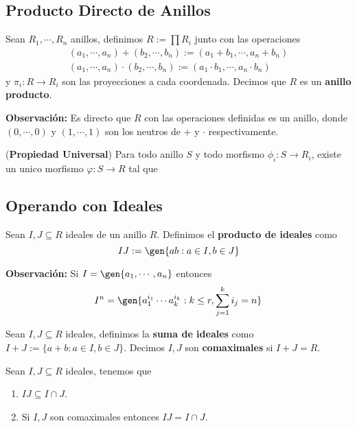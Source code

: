 \documentclass{article}
\begin{document}
\subsection{Producto Directo de Anillos}
\begin{dfn}
    Sean $R_{1},\cdots,R_{n}$ anillos, definimos $R:=\prod R_{i}$ junto con las operaciones
    \begin{align*}
        (a_{1},\cdots,a_{n})+(b_{2},\cdots,b_{n}):=(a_{1}+b_{1},\cdots,a_{n}+b_{n}) \\
        (a_{1},\cdots,a_{n})\cdot(b_{2},\cdots,b_{n}):=(a_{1}\cdot b_{1},\cdots,a_{n}\cdot b_{n})
    \end{align*}
    y $\pi_{i}:R\to R_{i}$ son las proyecciones a cada coordenada. Decimos que $R$ es un
    \textbf{anillo producto}.
\end{dfn}
\noindent\textbf{Observación:} Es directo que $R$ con las operaciones definidas es un anillo, donde
$(0,\cdots,0)$ y $(1,\cdots,1)$ son los neutros de $+$ y $\cdot$ respectivamente.
\begin{prop}
    (\textbf{Propiedad Universal}) Para todo anillo $S$ y todo morfismo $\phi_{i}:S\to R_{i}$, 
    existe un unico morfismo $\varphi:S\to R$ tal que
    
    \centerline{
    }
\end{prop}

\subsection{Operando con Ideales}
\begin{dfn}
    Sean $I,J\subseteq R$ ideales de un anillo $R$. Definimos el \textbf{producto de ideales}
    como
    \begin{equation*}
        IJ:=\gen{ab:a\in I,b\in J}
    \end{equation*}
\end{dfn}
\noindent\textbf{Observación:} Si $I=\gen{a_{1},\cdots,a_{n}}$ entonces
\begin{equation*}
    I^{n}=\gen{a_{1}^{i_{1}}\cdots a_{k}^{i_{k}}:k\leq r,\sum_{j=1}^{k}i_{j}=n}
\end{equation*}
\begin{dfn}
    Sean $I,J\subseteq R$ ideales, definimos la \textbf{suma de ideales} como 
    $I+J:=\{a+b:a\in I,b\in J\}$. Decimos $I,J$ son \textbf{comaximales} si $I+J=R$.
\end{dfn}
\begin{prop} Sean $I,J\subseteq R$ ideales, tenemos que
    \begin{enumerate}
        \item $IJ\subseteq I\cap J$.
        \item Si $I,J$ son comaximales entonces $IJ=I\cap J$.
    \end{enumerate}
\end{prop}
\end{document}
